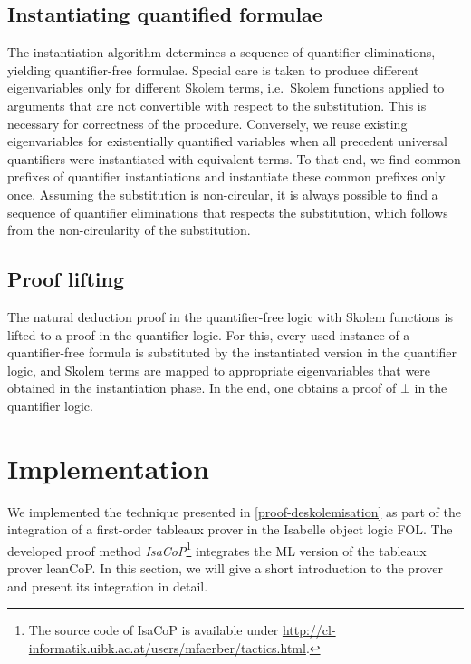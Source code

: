 \documentclass[]{article}
\begin{document}
\subsection{Instantiating quantified
formulae}\label{instantiating-quantified-formulae}

The instantiation algorithm determines a sequence of quantifier
eliminations, yielding quantifier-free formulae. Special care is taken
to produce different eigenvariables only for different Skolem terms,
i.e.~Skolem functions applied to arguments that are not convertible with
respect to the substitution. This is necessary for correctness of the
procedure. Conversely, we reuse existing eigenvariables for
existentially quantified variables when all precedent universal
quantifiers were instantiated with equivalent terms. To that end, we
find common prefixes of quantifier instantiations and instantiate these
common prefixes only once. Assuming the substitution is non-circular, it
is always possible to find a sequence of quantifier eliminations that
respects the substitution, which follows from the non-circularity of the
substitution.

\subsection{Proof lifting}\label{proof-lifting}

The natural deduction proof in the quantifier-free logic with Skolem
functions is lifted to a proof in the quantifier logic. For this, every
used instance of a quantifier-free formula is substituted by the
instantiated version in the quantifier logic, and Skolem terms are
mapped to appropriate eigenvariables that were obtained in the
instantiation phase. In the end, one obtains a proof of \(\bot\) in the
quantifier logic.

\section{Implementation}\label{implementation}

We implemented the technique presented in
\autoref{proof-deskolemisation} as part of the integration of a
first-order tableaux prover in the Isabelle object logic FOL. The
developed proof method \emph{IsaCoP}\footnote{The source code of IsaCoP
  is available under
  \url{http://cl-informatik.uibk.ac.at/users/mfaerber/tactics.html}.}
integrates the ML version of the tableaux prover leanCoP. In this
section, we will give a short introduction to the prover and present its
integration in detail.
\end{document}
